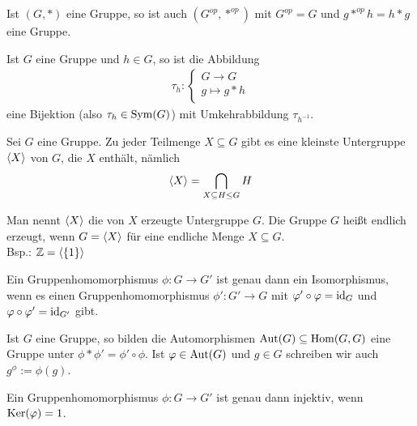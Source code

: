 \begin{bsp}
	Ist $(G,*)$ eine Gruppe, so ist auch  $(G^{op}, *^{op})$ mit $G^{op} = G$ und $g *^{op} h = h * g$ eine Gruppe.
\end{bsp}

\begin{bem}
	Ist $G$ eine Gruppe und $h \in G$, so ist die Abbildung
	\begin{align*}
		\tau_h : \begin{cases}
		G \to G \\
		g \mapsto g*h \\
		\end{cases}
	\end{align*}
	eine Bijektion (also $\tau_h \in \operatorname{Sym}(G)$) mit Umkehrabbildung $\tau_{h^{-1}}$.
\end{bem}

\begin{satz}
	Sei $G$ eine Gruppe. Zu jeder Teilmenge $X \subseteq G$ gibt es eine kleinste Untergruppe $\langle X \rangle$ von $G$, die $X$ enthält, nämlich 
	\begin{align*}
		\langle X \rangle= \bigcap \limits_{X \subseteq H \leq G} H
	\end{align*}
\end{satz}

\begin{bem}
	Man nennt $\langle X \rangle$ die von $X$ erzeugte Untergruppe $G$. Die Gruppe $G$ heißt endlich erzeugt, wenn $G = \langle X \rangle$ für eine endliche Menge $X \subseteq G$.\\
	Bsp.: $\mathbb{Z} = \langle \{1\} \rangle$
\end{bem}

\begin{satz}
	Ein Gruppenhomomorphismus $\phi : G \to G'$ ist genau dann ein Isomorphismus, wenn	es einen Gruppenhomomorphismus $\phi': G' \to G$  mit $\varphi' \circ \varphi = \operatorname{id}_G$ und $\varphi \circ \varphi' = \operatorname{id}_{G'}$ gibt.
\end{satz}

\begin{bsp}
	Ist $G$ eine Gruppe, so bilden die Automorphismen $\operatorname{Aut}(G) \subseteq \operatorname{Hom}(G,G)$ eine Gruppe unter $\phi * \phi' = \phi' \circ \phi$. Ist $\varphi \in \operatorname{Aut}(G)$ und $g \in G$ schreiben wir auch $g^{\phi}:=\phi(g)$.
\end{bsp}

\begin{satz}
	Ein Gruppenhomomorphismus $\phi : G \to G'$ ist genau dann injektiv, wenn $\operatorname{Ker}(\varphi)=1$.
\end{satz}

